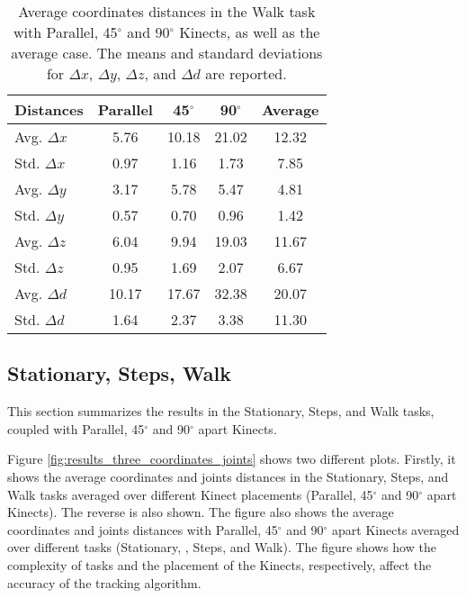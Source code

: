 \begin{table}[!htb]
  \centering

  \begin{tabularx}{1.0\columnwidth}{||X c c c c||} 
   \hline
   \textbf{Distances} & \textbf{Parallel} & \textbf{45$^{\circ}$} & \textbf{90$^{\circ}$} & \textbf{Average} \\ [0.5ex] 
   \hline\hline
   Avg. $\Delta x$ & 5.76 & 10.18 & 21.02 & 12.32 \\
   \hline
   Std. $\Delta x$ & 0.97 & 1.16 & 1.73 & 7.85 \\
   \hline
   Avg. $\Delta y$ & 3.17 & 5.78 & 5.47 & 4.81 \\
   \hline
   Std. $\Delta y$ & 0.57 & 0.70 & 0.96 & 1.42 \\
   \hline
   Avg. $\Delta z$ & 6.04 & 9.94 & 19.03 & 11.67 \\
   \hline
   Std. $\Delta z$ & 0.95 & 1.69 & 2.07 & 6.67 \\
   \hline
   Avg. $\Delta d$ & 10.17 & 17.67 & 32.38 & 20.07 \\
   \hline
   Std. $\Delta d$ & 1.64 & 2.37 & 3.38 & 11.30 \\
   \hline
  \end{tabularx}

  \caption{Average coordinates distances in the Walk task with Parallel, 45$^{\circ}$ and 90$^{\circ}$ Kinects, as well as the average case. The means and standard deviations for $\Delta x$, $\Delta y$, $\Delta z$, and $\Delta d$ are reported.}
  
  \label{table:walk_coordinates_values}
\end{table}
\FloatBarrier

% 
% 
\subsection{Stationary, Steps, Walk}

This section summarizes the results in the Stationary, Steps, and Walk tasks, coupled with Parallel, 45$^{\circ}$ and 90$^{\circ}$ apart Kinects.

Figure \ref{fig:results_three_coordinates_joints} shows two different plots. Firstly, it shows the average coordinates and joints distances in the Stationary, Steps, and Walk tasks averaged over different Kinect placements (Parallel, 45$^{\circ}$ and 90$^{\circ}$ apart Kinects). The reverse is also shown. The figure also shows the average coordinates and joints distances with Parallel, 45$^{\circ}$ and 90$^{\circ}$ apart Kinects averaged over different tasks (Stationary, , Steps, and Walk). The figure shows how the complexity of tasks and the placement of the Kinects, respectively, affect the accuracy of the tracking algorithm.

